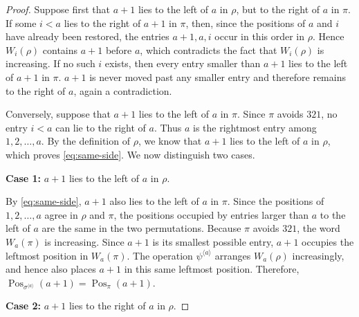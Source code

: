 \documentclass[11pt]{article}
\begin{document}
\begin{proof}
Suppose first that $a+1$ lies to the left of $a$ in $\rho$, but to the
right of $a$ in $\pi$. If some $i<a$ lies to the right of $a+1$ in
$\pi$, then, since the positions of $a$ and $i$ have already been
restored, the entries $a+1,a,i$ occur in this order in $\rho$. Hence
$W_i(\rho)$ contains $a+1$ before $a$, which contradicts
the fact that $W_i(\rho)$ is increasing.
If no such $i$ exists, then every entry smaller than $a+1$ lies to the
left of $a+1$ in $\pi$. $a+1$ is never moved past any smaller entry 
and therefore remains to the right of $a$, again a contradiction.

Conversely, suppose that $a+1$ lies to the left of $a$ in $\pi$. 
Since $\pi$ avoids $321$, no entry $i<a$ can lie to the right of $a$. 
Thus $a$ is the rightmost entry among $1,2,\ldots,a$. 
By the definition of $\rho$, we know that $a+1$ lies to the left of $a$ in $\rho$, which proves \eqref{eq:same-side}.
We now distinguish two cases.

\noindent \textbf{Case 1:} $a+1$ lies to the left of $a$ in $\rho$.

By \eqref{eq:same-side}, $a+1$ also lies to the left of $a$ in $\pi$.
Since the positions of $1,2,\ldots,a$ agree in $\rho$ and $\pi$, the
positions occupied by entries larger than $a$ to the left of $a$ are
the same in the two permutations. 
Because $\pi$ avoids $321$, the word $W_a(\pi)$ is increasing. Since
$a+1$ is its smallest possible entry, $a+1$ occupies the leftmost
position in $W_a(\pi)$. The operation $\psi^{\langle a\rangle}$
arranges $W_a(\rho)$ increasingly, and hence also places $a+1$ in this
same leftmost position. Therefore,
$\operatorname{Pos}_{\sigma^{\langle a\rangle}}(a+1)
=
\operatorname{Pos}_{\pi}(a+1)$.

\noindent \textbf{Case 2:} $a+1$ lies to the right of $a$ in $\rho$.


\end{proof}
\end{document}
